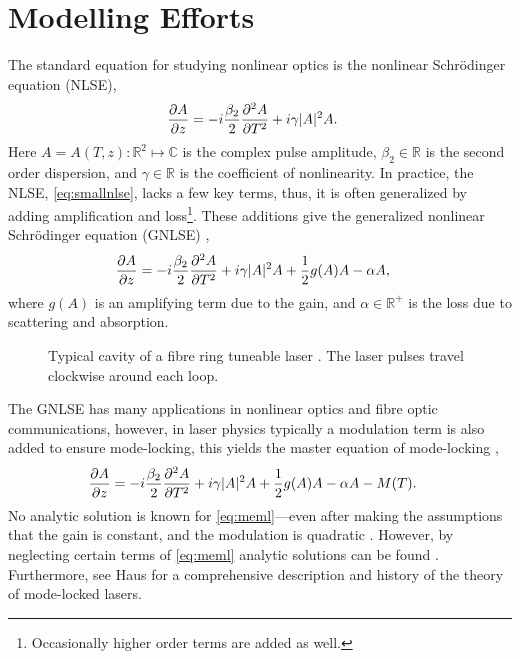 \documentclass[10pt,twocolumn,a4paper]{article}
\newcommand{\pdiff}[3][\hspace{-0.5pt}]{\frac{\partial^{#1}#2}{\partial{#3}^{#1}}}
\begin{document}
\section{Modelling Efforts}
\label{sec:modelling}
The standard equation for studying nonlinear optics is the nonlinear Schr\"odinger equation (NLSE),
\begin{align}
	\pdiff{A}{z} &= - i \frac{\beta_2}{2}\pdiff[2]{A}{T} + i \gamma |A|^2 A.
	\label{eq:smallnlse}
\end{align}
Here $A = A(T, z) : \mathbb{R}^2 \mapsto \mathbb{C}$ is the complex pulse amplitude, $\beta_2 \in \mathbb{R}$ is the second order dispersion, and $\gamma \in \mathbb{R}$ is the coefficient of nonlinearity. In practice, the NLSE, \eqref{eq:smallnlse}, lacks a few key terms, thus, it is often generalized by adding amplification and loss\footnote{Occasionally higher order terms are added as well.}. These additions give the generalized nonlinear Schr\"{o}dinger equation (GNLSE) \cite{agrawal2013, bohun2015, finot2008, peng2018, shtyrina2017, yarutkina2013},
	\begin{align}
	\pdiff{A}{z} &= - i \frac{\beta_2}{2}\pdiff[2]{A}{T} + i \gamma |A|^2 A + \frac{1}{2}g(A) A - \alpha A,
	\label{eq:nlse}
\end{align}
where $g(A)$ is an amplifying term due to the gain, and $\alpha \in \mathbb{R}^+$ is the loss due to scattering and absorption.

\begin{figure}[tbp]
	\centering
	
	\caption{Typical cavity of a fibre ring tuneable laser \cite{burgoyne2014, chung2017, lapre2019, shao2019, tang2014}. The laser pulses travel clockwise around each loop.}
	\label{fig:cavity}
\end{figure}

The GNLSE has many applications in nonlinear optics and fibre optic communications, however, in laser physics typically a modulation term is also added to ensure mode-locking, this yields the master equation of mode-locking \cite{haus1984, haus1975, haus1986, haus1992, haus2000, tamura1996, usechak2005},
\begin{align}
	\pdiff{A}{z} &= - i \frac{\beta_2}{2}\pdiff[2]{A}{T} + i \gamma |A|^2 A + \frac{1}{2}g(A) A - \alpha A - M(T).
	\label{eq:meml}
\end{align}
No analytic solution is known for \eqref{eq:meml}---even after making the assumptions that the gain is constant, and the modulation is quadratic \cite{haus1984, haus1975, haus1996}. However, by neglecting certain terms of \eqref{eq:meml} analytic solutions can be found \cite{burgoyne2014, haus1975, haus1986, haus1991, haus1992, haus1996, tamura1996, usechak2005}. Furthermore, see Haus \cite{haus2000} for a comprehensive description and history of the theory of mode-locked lasers.
\end{document}
